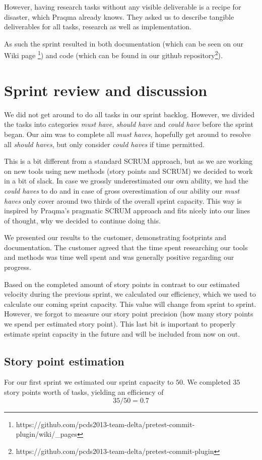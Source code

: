 \documentclass[a4paper]{article}
\begin{document}
However, having research tasks without any visible deliverable is a recipe for
disaster, which Praqma already knows. They asked us to describe tangible
deliverables for all tasks, research as well as implementation.

As such the sprint resulted in both documentation (which can be seen on our Wiki
page
\footnote{https://github.com/pcds2013-team-delta/pretest-commit-plugin/wiki/\_pages})
and code (which can be found in our github
repository\footnote{https://github.com/pcds2013-team-delta/pretest-commit-plugin}).

\section{Sprint review and discussion}
We did not get around to do all tasks in our sprint backlog. However, we divided
the tasks into categories {\it must have}, {\it should have} and
{\it could have} before the sprint began. Our aim was to complete all
{\it must haves}, hopefully get around to resolve all {\it should
haves}, but only consider {\it could haves} if time permitted.

This is a bit different from a standard SCRUM approach, but as we are working on
new tools using new methods (story points and SCRUM) we decided to work in a bit
of slack. In case we grossly underestimated our own ability, we had the {\it
could haves} to do and in case of gross overestimation of our ability our
{\it must haves} only cover around two thirds of the overall sprint
capacity. This way is inspired by Praqma's pragmatic SCRUM approach and fits nicely into
our lines of thought, why we decided to continue doing this.

We presented our results to the customer, demonstrating footprints and
documentation. The customer agreed that the time spent researching our tools and methods was
time well spent and was generally positive regarding our progress.

Based on the completed amount of story points in contrast to our estimated
velocity during the previous sprint, we calculated our efficiency, which we used
to calculate our coming sprint capacity. This value will change from sprint to
sprint. However, we forgot to measure our story point precision (how many story
points we spend per estimated story point). This last bit is important to
properly estimate sprint capacity in the future and will be included from now on
out.

\subsection{Story point estimation}
For our first sprint we estimated our sprint capacity to $50$. We completed $35$
story points worth of tasks, yielding an efficiency of
$$35/50 = 0.7$$
\end{document}
